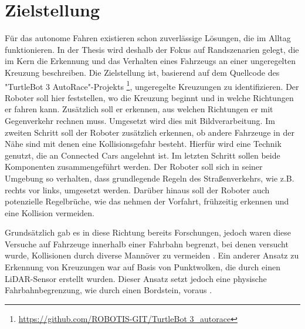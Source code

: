 \section{Zielstellung}
Für das autonome Fahren existieren schon zuverlässige Lösungen, die im Alltag funktionieren. In der Thesis wird deshalb der Fokus auf Randszenarien gelegt, die im Kern die Erkennung
und das Verhalten eines Fahrzeugs an einer ungeregelten Kreuzung beschreiben. Die Zielstellung ist, basierend auf dem Quellcode des "TurtleBot 3 AutoRace"-Projekts \footnote{\url{https://github.com/ROBOTIS-GIT/TurtleBot 3_autorace}},
ungeregelte Kreuzungen zu identifizieren. Der Roboter soll hier feststellen, wo die Kreuzung beginnt und in welche Richtungen er fahren kann. Zusätzlich soll er erkennen,
aus welchen Richtungen er mit Gegenverkehr rechnen muss. Umgesetzt wird dies mit Bildverarbeitung.
Im zweiten Schritt soll der Roboter zusätzlich erkennen, ob andere Fahrzeuge in der Nähe sind mit denen eine Kollisionsgefahr besteht. Hierfür wird eine Technik genutzt, die an Connected
Cars angelehnt ist.
Im letzten Schritt sollen beide Komponenten zusammengeführt werden. Der Roboter soll sich in seiner Umgebung so verhalten, dass grundlegende Regeln des Straßenverkehrs, wie z.B. rechts vor
links, umgesetzt werden. Darüber hinaus soll der Roboter auch potenzielle Regelbrüche, wie das nehmen der Vorfahrt, frühzeitig erkennen und eine Kollision vermeiden.

Grundsätzlich gab es in diese Richtung bereits Forschungen, jedoch waren diese Versuche auf Fahrzeuge innerhalb einer Fahrbahn begrenzt, bei denen versucht wurde, Kollisionen durch
diverse Mannöver zu vermeiden \cite{griffith}. Ein anderer Ansatz zu Erkennung von Kreuzungen war auf Basis von Punktwolken, die durch einen LiDAR-Sensor erstellt wurden. Dieser Ansatz
setzt jedoch eine physische Fahrbahnbegrenzung, wie durch einen Bordstein, voraus \cite{lidar-recognition}.

